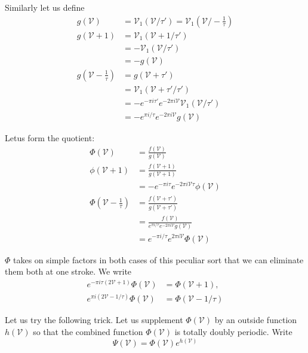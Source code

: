 Similarly let us define
\begin{align*}
  g(\mathscr{V}) & = \mathscr{V}_1 (\mathscr{V}/ \tau') =
  \mathscr{V}_1 \left(\mathscr{V}/- \frac{1}{\tau}\right)\\
  g(\mathscr{V}+1) & = \mathscr{V}_1 (\mathscr{V}+ 1/\tau')\\
  & = - \mathscr{V}_1 (\mathscr{V}/ \tau')\\
  & = - g(\mathscr{V})\\
  g\left(\mathscr{V}- \frac{1}{\tau}\right) & = g(\mathscr{V}+ \tau')\\
  & = \mathscr{V}_1 (\mathscr{V}+ \tau'/\tau')\\
  & = - e^{-\pi i \tau'} e^{- 2 \pi i \mathscr{V}} \mathscr{V}_1
  (\mathscr{V}/ \tau')\\
  & =- e^{\pi i/\tau} e^{- 2 \pi i \mathscr{V}} g(\mathscr{V})
\end{align*}

Let\pageoriginale us form the quotient:
\begin{align*}
  \Phi (\mathscr{V}) & = \frac{f(\mathscr{V})}{g(\mathscr{V})}\\
  \phi (\mathscr{V}+1) & = \frac{f(\mathscr{V}+1)}{g(\mathscr{V}+1)}\\
  & = -e^{-\pi i \tau} e^{-2\pi i \mathscr{V} \tau} \phi
  (\mathscr{V})\\
  \Phi \left(\mathscr{V}- \frac{1}{\tau}\right) & = \frac{f(\mathscr{V}+
    \tau')}{g(\mathscr{V}+ \tau')}\\
  & = \frac{f(\mathscr{V})}{e^{\pi i/\tau} e^{- 2 \pi i \mathscr{V}}
    g(\mathscr{V})}\\
  & = e^{- \pi i / \tau} e^{2 \pi i \mathscr{V}} \Phi (\mathscr{V}) 
\end{align*}

$\Phi$ takes on simple factors in both cases of this peculiar sort
that we can eliminate them both at one stroke. We write
\begin{align*}
  e^{- \pi i \tau (2 \mathscr{V}+1)} \Phi (\mathscr{V}) & = \Phi
  (\mathscr{V}+1),\\
  e^{\pi i (2 \mathscr{V}-1/\tau)} \Phi (\mathscr{V}) & = \Phi (\mathscr{V}-1/\tau)
\end{align*}

Let us try the following trick. Let us supplement $\Phi (\mathscr{V})$
by an outside function $h(\mathscr{V})$ so that the combined function
$\Phi(\mathscr{V})$ is totally doubly periodic. Write 
$$
\Psi (\mathscr{V}) = \Phi (\mathscr{V}) e^{h(\mathscr{V})}
$$ 

